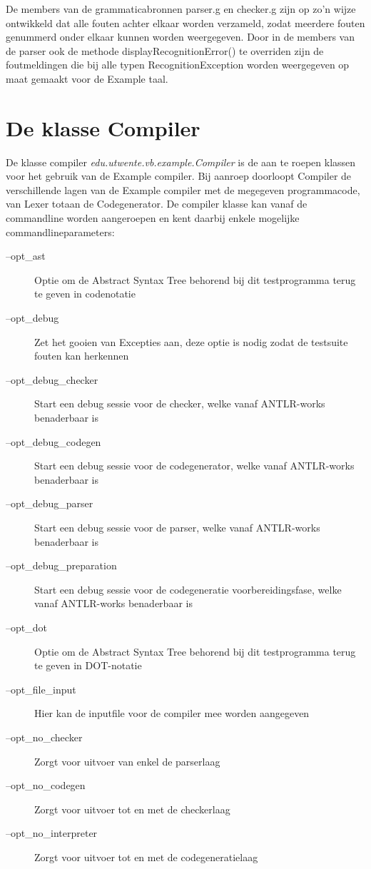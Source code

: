 De members van de grammaticabronnen parser.g en checker.g zijn op zo'n wijze ontwikkeld dat alle fouten achter elkaar worden verzameld, zodat meerdere fouten genummerd onder elkaar kunnen worden weergegeven. Door in de members van de parser ook de methode displayRecognitionError() te overriden zijn de foutmeldingen die bij alle typen RecognitionException worden weergegeven op maat gemaakt voor de Example taal.

\section{De klasse Compiler}
De klasse compiler \emph{edu.utwente.vb.example.Compiler} is de aan te roepen klassen voor het gebruik van de Example compiler. Bij aanroep doorloopt Compiler de verschillende lagen van de Example compiler met de megegeven programmacode, van Lexer totaan de Codegenerator. De compiler klasse kan vanaf de commandline worden aangeroepen en kent daarbij enkele mogelijke commandlineparameters:
\begin{description}
    \item[--opt\_ast]                   Optie om de Abstract Syntax Tree behorend bij dit testprogramma terug te geven in codenotatie
    \item[--opt\_debug]                 Zet het gooien van Excepties aan, deze optie is nodig zodat de testsuite fouten kan herkennen
    \item[--opt\_debug\_checker]        Start een debug sessie voor de checker, welke vanaf ANTLR-works benaderbaar is
    \item[--opt\_debug\_codegen]        Start een debug sessie voor de codegenerator, welke vanaf ANTLR-works benaderbaar is
    \item[--opt\_debug\_parser]         Start een debug sessie voor de parser, welke vanaf ANTLR-works benaderbaar is
    \item[--opt\_debug\_preparation]    Start een debug sessie voor de codegeneratie voorbereidingsfase, welke vanaf ANTLR-works benaderbaar is
    \item[--opt\_dot]                   Optie om de Abstract Syntax Tree behorend bij dit testprogramma terug te geven in DOT-notatie
    \item[--opt\_file\_input]           Hier kan de inputfile voor de compiler mee worden aangegeven
    \item[--opt\_no\_checker]           Zorgt voor uitvoer van enkel de parserlaag
    \item[--opt\_no\_codegen]           Zorgt voor uitvoer tot en met de checkerlaag
    \item[--opt\_no\_interpreter]       Zorgt voor uitvoer tot en met de codegeneratielaag
\end{description}

